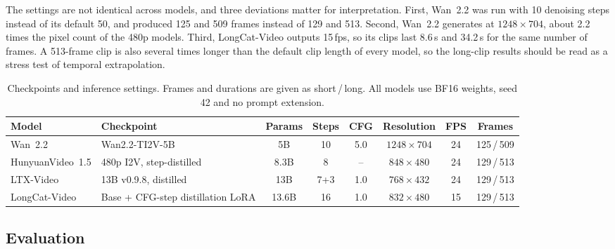 \documentclass[11pt,a4paper]{article}
\begin{document}
The settings are not identical across models, and three deviations matter for interpretation. First, Wan~2.2 was run with 10 denoising steps instead of its default 50, and produced 125 and 509 frames instead of 129 and 513. Second, Wan~2.2 generates at $1248\times704$, about 2.2 times the pixel count of the 480p models. Third, LongCat-Video outputs 15\,fps, so its clips last 8.6\,s and 34.2\,s for the same number of frames. A 513-frame clip is also several times longer than the default clip length of every model, so the long-clip results should be read as a stress test of temporal extrapolation.

\begin{table}[!htb]
  \centering
  \small
  \caption{Checkpoints and inference settings. Frames and durations are given as short\,/\,long. All models use BF16 weights, seed 42 and no prompt extension.}
  \label{tab:config}
  \begin{tabularx}{\linewidth}{@{}l L c c c c c c@{}}
    \toprule
    Model & Checkpoint & Params & Steps & CFG & Resolution & FPS & Frames \\
    \midrule
    Wan~2.2          & Wan2.2-TI2V-5B                         & 5B    & 10    & 5.0 & $1248\times704$ & 24 & 125\,/\,509 \\
    HunyuanVideo~1.5 & 480p I2V, step-distilled               & 8.3B  & 8     & --  & $848\times480$  & 24 & 129\,/\,513 \\
    LTX-Video        & 13B v0.9.8, distilled                  & 13B   & 7+3   & 1.0 & $768\times432$  & 24 & 129\,/\,513 \\
    LongCat-Video    & Base + CFG-step distillation LoRA      & 13.6B & 16    & 1.0 & $832\times480$  & 15 & 129\,/\,513 \\
    \bottomrule
  \end{tabularx}
\end{table}

\subsection{Evaluation}
\label{sec:evaluation}
\end{document}
